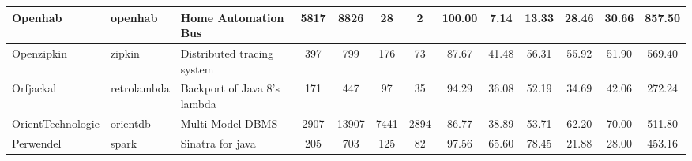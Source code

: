 \begin{table*}[]
{\begin{tabular}{lll|ccc|cccc|ccc}
Openhab                     & openhab                                                       & Home Automation Bus                                                      & 5817           & 8826            & 28                                                               & 2              & 100.00         & 7.14           & 13.33          & 28.46                                                             & 30.66                                                              & 857.50                                               \\ \hline
Openzipkin                  & zipkin                                                        & Distributed tracing system                                               & 397            & 799             & 176                                                              & 73             & 87.67          & 41.48          & 56.31          & 55.92                                                             & 51.90                                                              & 569.40                                               \\ \hline
Orfjackal                   & retrolambda                                                   & Backport of Java 8's lambda                                              & 171            & 447             & 97                                                               & 35             & 94.29          & 36.08          & 52.19          & 34.69                                                             & 42.06                                                              & 272.24                                               \\ \hline
OrientTechnologie           & orientdb                                                      & Multi-Model DBMS                                                         & 2907           & 13907           & 7441                                                             & 2894           & 86.77          & 38.89          & 53.71          & 62.20                                                             & 70.00                                                              & 511.80                                               \\ \hline
Perwendel                   & spark                                                         & Sinatra  for java                                                        & 205            & 703             & 125                                                              & 82             & 97.56          & 65.60          & 78.45          & 21.88                                                             & 28.00                                                              & 453.16                                               \\ \hline

\end{tabular}}
\end{table*}
